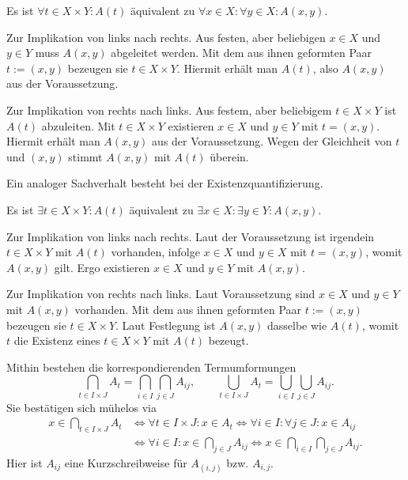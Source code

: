\begin{Satz}
Es ist $\forall t\in X\times Y\colon A(t)$
äquivalent zu $\forall x\in X\colon\forall y\in X\colon A(x,y)$.
\end{Satz}
\begin{Beweis}
Zur Implikation von links nach rechts. Aus festen, aber beliebigen
$x\in X$ und $y\in Y$ muss $A(x,y)$ abgeleitet werden. Mit dem aus ihnen geformten
Paar $t:=(x,y)$ bezeugen sie $t\in X\times Y$. Hiermit erhält man $A(t)$,
also $A(x,y)$ aus der Voraussetzung.

Zur Implikation von rechts nach links. Aus festem, aber beliebigem
$t\in X\times Y$ ist $A(t)$ abzuleiten. Mit $t\in X\times Y$ existieren
$x\in X$ und $y\in Y$ mit $t=(x,y)$. Hiermit erhält man $A(x,y)$ aus
der Voraussetzung. Wegen der Gleichheit von $t$ und $(x,y)$ stimmt
$A(x,y)$ mit $A(t)$ überein.\,\qedsymbol
\end{Beweis}

\noindent
Ein analoger Sachverhalt besteht bei der Existenzquantifizierung.

\begin{Satz}
Es ist $\exists t\in X\times Y\colon A(t)$ äquivalent zu
$\exists x\in X\colon\exists y\in Y\colon A(x,y)$.
\end{Satz}
\begin{Beweis}
Zur Implikation von links nach rechts. Laut der Voraussetzung ist
irgendein $t\in X\times Y$ mit $A(t)$ vorhanden, infolge $x\in X$ und $y\in X$
mit $t=(x,y)$, womit $A(x,y)$ gilt. Ergo existieren $x\in X$ und
$y\in Y$ mit $A(x,y)$.

Zur Implikation von rechts nach links. Laut Voraussetzung sind $x\in X$
und $y\in Y$ mit $A(x,y)$ vorhanden. Mit dem aus ihnen geformten
Paar $t:=(x,y)$ bezeugen sie $t\in X\times Y$. Laut Festlegung ist
$A(x,y)$ dasselbe wie $A(t)$, womit $t$ die Existenz eines
$t\in X\times Y$ mit $A(t)$ bezeugt.\,\qedsymbol
\end{Beweis}

\noindent
Mithin bestehen die korrespondierenden Termumformungen
\[\bigcap_{t\in I\times J} A_t = \bigcap_{i\in I}\bigcap_{j\in J} A_{ij},\qquad
\bigcup_{t\in I\times J} A_t = \bigcup_{i\in I}\bigcup_{j\in J} A_{ij}.\]
Sie bestätigen sich mühelos via
\begin{align*}\textstyle
x\in\bigcap_{t\in I\times J} A_t &\iff
\forall t\in I\times J\colon x\in A_t
\iff\forall i\in I\colon\forall j\in J\colon x\in A_{ij}\\
&\textstyle\iff\forall i\in I\colon x\in\bigcap_{j\in J} A_{ij}
\iff x\in\bigcap_{i\in I}\bigcap_{j\in J} A_{ij}.
\end{align*}
Hier ist $A_{ij}$ eine Kurzschreibweise für $A_{(i,j)}$
bzw. $A_{i,j}$.

